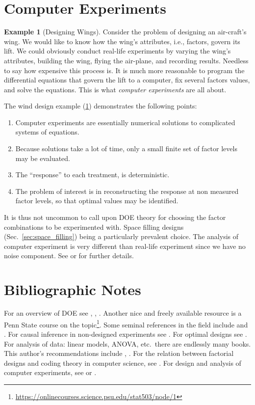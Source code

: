 \documentclass[12pt,a4paper]{report}
\theoremstyle{plain}
\theoremstyle{definition}
\newtheorem{example}{Example}
\begin{document}
\section{Computer Experiments}
\begin{example}[Designing Wings]
\label{eg:wings}
Consider the problem of designing an air-craft's wing.
We would like to know how the wing's attributes, i.e., factors, govern its lift.
We could obviously conduct real-life experiments by varying the wing's attributes, building the wing, flying the air-plane, and recording results. 
Needless to say how expensive this process is.
It is much more reasonable to program the differential equations that govern the lift to a computer, fix several factors values, and solve the equations.
This is what \emph{computer experiments} are all about. 
\end{example}


The wind design example (\ref{eg:wings}) demonstrates the following points:
\begin{enumerate}
\item Computer experiments are essentially numerical solutions to complicated systems of equations.
\item Because solutions take a lot of time, only a small finite set of factor levels may be evaluated. 
\item The ``response'' to each treatment, is deterministic. 
\item The problem of interest is in reconstructing the response at non measured factor levels, so that optimal values may be identified. 
\end{enumerate}
It is thus not uncommon to call upon DOE theory for choosing the factor combinations to be experimented with. Space filling designs (Sec.~\ref{sec:space_filling}) being a particularly prevalent choice. 
The analysis of computer experiment is very different than real-life experiment since we have no noise component. 
See \cite{sacks_design_1989} or \cite{santner_design_2013} for further details. 



\section{Bibliographic Notes}
For an overview of DOE see \cite{cox_theory_2000}, \cite{mason_statistical_2003}, \cite{everitt_cambridge_2010}. 
Another nice and freely available resource is a Penn State course on the topic\footnote{\url{https://onlinecourses.science.psu.edu/stat503/node/1}}. 
Some seminal references in the field include \cite{fisher_design_1960} and \cite{box_statistics_1978}.
For causal inference in non-designed experiments see \cite{rosenbaum_observational_2002}. 
For optimal designs see \cite{pukelsheim_optimal_1993}.
For analysis of data: linear models, ANOVA, etc.\ there are endlessly many books. This author's recommendations include \cite{hocking_analysis_1985}, \cite{greene_econometric_2003}. 
For the relation between factorial designs and coding theory in computer science, see \cite{hill_first_1986}. 
For design and analysis of computer experiments, see \cite{sacks_design_1989} or \cite{santner_design_2013}.
\end{document}

